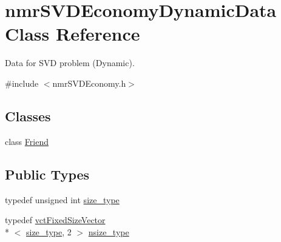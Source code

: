 \hypertarget{classnmr_s_v_d_economy_dynamic_data}{\section{nmr\-S\-V\-D\-Economy\-Dynamic\-Data Class Reference}
\label{classnmr_s_v_d_economy_dynamic_data}
}


Data for S\-V\-D problem (Dynamic).  




{\ttfamily \#include $<$nmr\-S\-V\-D\-Economy.\-h$>$}

\subsection*{Classes}
\begin{DoxyCompactItemize}
\item 
class \hyperlink{classnmr_s_v_d_economy_dynamic_data_1_1_friend}{Friend}
\end{DoxyCompactItemize}
\subsection*{Public Types}
\begin{DoxyCompactItemize}
\item 
typedef unsigned int \hyperlink{classnmr_s_v_d_economy_dynamic_data_aee8ff15f2e92af24fdc3c7f5908770f3}{size\-\_\-type}
\item 
typedef \hyperlink{classvct_fixed_size_vector}{vct\-Fixed\-Size\-Vector}\\*
$<$ \hyperlink{classnmr_s_v_d_economy_dynamic_data_aee8ff15f2e92af24fdc3c7f5908770f3}{size\-\_\-type}, 2 $>$ \hyperlink{classnmr_s_v_d_economy_dynamic_data_a237cfc6761af61ac2016b2b1e71284f1}{nsize\-\_\-type}
\end{DoxyCompactItemize}
